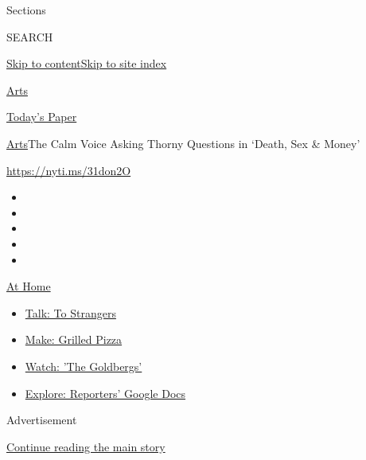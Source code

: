 Sections

SEARCH

\protect\hyperlink{site-content}{Skip to
content}\protect\hyperlink{site-index}{Skip to site index}

\href{https://www.nytimes.com/section/arts}{Arts}

\href{https://myaccount.nytimes.com/auth/login?response_type=cookie\&client_id=vi}{}

\href{https://www.nytimes.com/section/todayspaper}{Today's Paper}

\href{/section/arts}{Arts}\textbar{}The Calm Voice Asking Thorny
Questions in `Death, Sex \& Money'

\url{https://nyti.ms/31don2O}

\begin{itemize}
\item
\item
\item
\item
\item
\end{itemize}

\href{https://www.nytimes.com/spotlight/at-home?action=click\&pgtype=Article\&state=default\&region=TOP_BANNER\&context=at_home_menu}{At
Home}

\begin{itemize}
\tightlist
\item
  \href{https://www.nytimes.com/2020/08/03/well/family/the-benefits-of-talking-to-strangers.html?action=click\&pgtype=Article\&state=default\&region=TOP_BANNER\&context=at_home_menu}{Talk:
  To Strangers}
\item
  \href{https://www.nytimes.com/2020/08/01/at-home/coronavirus-make-pizza-on-a-grill.html?action=click\&pgtype=Article\&state=default\&region=TOP_BANNER\&context=at_home_menu}{Make:
  Grilled Pizza}
\item
  \href{https://www.nytimes.com/2020/07/31/arts/television/goldbergs-abc-stream.html?action=click\&pgtype=Article\&state=default\&region=TOP_BANNER\&context=at_home_menu}{Watch:
  'The Goldbergs'}
\item
  \href{https://www.nytimes.com/interactive/2020/at-home/even-more-reporters-editors-diaries-lists-recommendations.html?action=click\&pgtype=Article\&state=default\&region=TOP_BANNER\&context=at_home_menu}{Explore:
  Reporters' Google Docs}
\end{itemize}

Advertisement

\protect\hyperlink{after-top}{Continue reading the main story}

